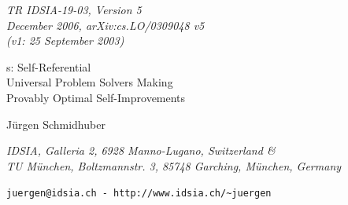 \begin{titlepage}

\begin{center}


\vspace{3cm}
\vspace{0.6cm}

{\em TR IDSIA-19-03, Version 5 \\
December 2006, arXiv:cs.LO/0309048 v5 \\
(v1: 25 September 2003)
}
\vspace{0.9cm}

{\LARGE \GMn s: Self-Referential \\
Universal Problem Solvers Making \\
\vspace{0.2cm}
Provably Optimal Self-Improvements}

\vspace{0.2cm}

\end{center}

\begin{center}

J\"{u}rgen Schmidhuber

{\it IDSIA, Galleria 2, 6928 Manno-Lugano, Switzerland \& \\
TU M\"{u}nchen, Boltzmannstr. 3,  85748 Garching, M\"{u}nchen, Germany}

{\tt juergen@idsia.ch - http://www.idsia.ch/\~{ }juergen}


\end{center}

\vspace{0.2cm}



\begin{abstract}

We present the first class of mathematically rigorous, general, fully
self-referential, self-improving, optimally efficient problem solvers.
Inspired by Kurt G\"{o}del's celebrated self-referential formulas (1931),
such a problem solver rewrites any part of its own code as soon
as it has found a proof that the rewrite is {\em useful,} where the
problem-dependent utility function and the hardware and the entire
initial code are described by axioms encoded in an initial proof
searcher which is also part of the initial code.  The searcher
systematically and in an asymptotically optimally efficient way tests
computable {\em proof techniques} (programs whose outputs are proofs)
until it finds a provably useful, computable self-rewrite.  We show
that such a self-rewrite is globally optimal---no local maxima!---since
the code first had to prove that it is not useful to continue the
proof search for alternative self-rewrites.  Unlike Hutter's previous {\em
non}-self-referential methods based on hardwired proof searchers, ours
not only boasts an optimal {\em order} of complexity but can optimally
reduce any slowdowns hidden by the $O()$-notation, provided the utility
of such speed-ups is provable at all.


\end{abstract}
\end{titlepage}
